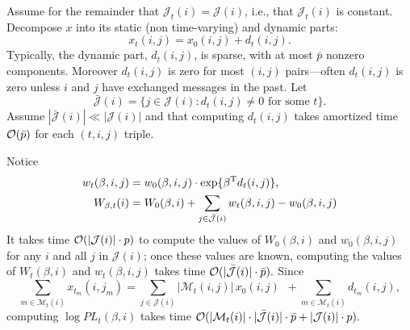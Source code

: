 \documentclass[aoas,preprint]{imsart}
\begin{document}
Assume for the remainder that
$\mathcal{J}_t(i) = \mathcal{J}(i)$, i.e., that $\mathcal{J}_t(i)$ is
constant.  Decompose $x$ into its static (non time-varying) and dynamic parts:
\[
    x_t(i,j)
        = x_0(i,j) + d_t(i,j).
\]
Typically, the dynamic part, $d_t(i,j)$, is sparse, with at most $\bar p$
nonzero components.  Moreover $d_t(i,j)$ is zero for most $(i,j)$
pairs---often $d_t(i,j)$ is zero unless $i$ and $j$ have exchanged
messages in the past.  Let
\[
    \mathcal{\bar J}(i)
        =
        \{
            j \in \mathcal{J}(i) : d_t(i,j) \neq 0
            \,\,
            \text{for some $t$}
        \}.
\]
Assume $|\mathcal{\bar J}(i)| \ll |\mathcal{J}(i)|$ and that
computing $d_t(i,j)$ takes amortized time $\mathcal{O}(\bar p)$ for each
$(t,i,j)$ triple.

Notice
\begin{align*}
    w_{t}(\beta,i,j)
        &=
            w_{0}(\beta,i,j)
            \cdot
            \exp\{ \beta^\trans d_t(i,j) \}, \\
    W_{\beta,t}(i)
        &=
            W_{0}(\beta,i)
            +
            \sum_{j \in \mathcal{\bar J}(i)}
                w_{t}(\beta,i,j) - w_{0}(\beta,i,j)
\end{align*}
It takes time $\mathcal{O}(|\mathcal{J}(i)| \cdot p)$ to compute the values of
$W_{0}(\beta,i)$ and $w_{0}(\beta,i,j)$ for any $i$ and all
$j$ in $\mathcal{J}(i)$; once these values are known, computing the values
of $W_{t}(\beta,i)$ and $w_{t}(\beta,i,j)$ takes time
\(
    \mathcal{O}(|\mathcal{\bar J}(i)| \cdot \bar p).
\)
Since
\[
    \sum_{m\in \mathcal{M}_t(i)}
        x_{t_m}\!(i,j_m)
        =
            \sum_{j \in \mathcal{J}(i)}
                |\mathcal{M}_t(i,j)| \, x_0(i,j)
            \,\,\,
            +
            \sum_{m \in \mathcal{M}_t(i)}
                d_{t_m}\!(i,j),
\]
computing $\log \mathit{PL}_t(\beta, i)$ takes time
\(
    \mathcal{O}(
        |\mathcal{M}_t(i)| \cdot |\mathcal{\bar J}(i)| \cdot \bar p
        +
        |\mathcal{J}(i)| \cdot p
    ).
\)
\end{document}

